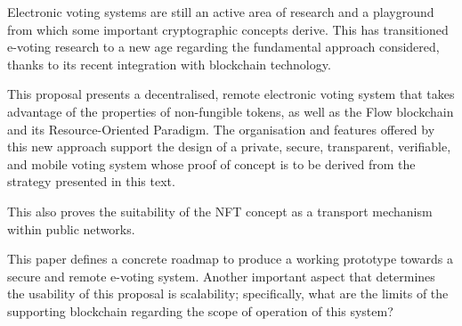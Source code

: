 \documentclass[../main.tex]{subfiles}
\begin{document}
Electronic voting systems are still an active area of research and a playground from which some important cryptographic concepts derive. This has transitioned e-voting research to a new age regarding the fundamental approach considered, thanks to its recent integration with blockchain technology.
\par
This proposal presents a decentralised, remote electronic voting system that takes advantage of the properties of non-fungible tokens, as well as the Flow blockchain and its Resource-Oriented Paradigm. The organisation and features offered by this new approach support the design of a private, secure, transparent, verifiable, and mobile voting system whose proof of concept is to be derived from the strategy presented in this text.
\par
This also proves the suitability of the NFT concept as a transport mechanism within public networks.
\par
This paper defines a concrete roadmap to produce a working prototype towards a secure and remote e-voting system. Another important aspect that determines the usability of this proposal is scalability; specifically, what are the limits of the supporting blockchain regarding the scope of operation of this system?
\end{document}
